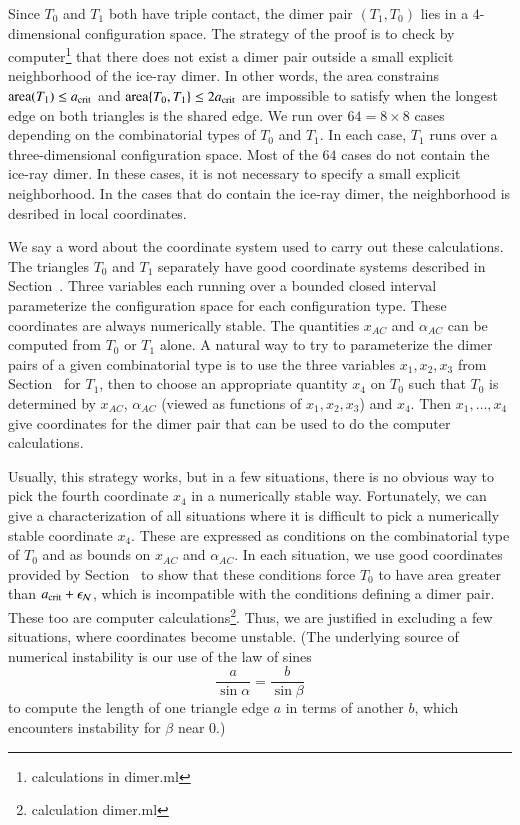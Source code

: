 Since $T_0$ and $T_1$ both have triple contact, the dimer pair
$(T_1,T_0)$ lies in a $4$-dimensional configuration space.  The
strategy of the proof is to check by computer\footnote{calculations in
  dimer.ml} that there does not exist a dimer pair outside a small
explicit neighborhood of the ice-ray dimer.  In other words, the area
constrains ${\operatorname{area}}(T_1)\le a_\text{crit}$ and ${\operatorname{area}}\{T_0,T_1\}\le2a_\text{crit}$ are
impossible to satisfy when the longest edge on both triangles is the
shared edge.  We run over $64 = 8\times 8$ cases depending on the
combinatorial types of $T_0$ and $T_1$.  In each case, $T_1$ runs over
a three-dimensional configuration space.  Most of the $64$ cases do
not contain the ice-ray dimer.  In these cases, it is not necessary to
specify a small explicit neighborhood.  In the cases that do contain
the ice-ray dimer, the neighborhood is desribed in local coordinates.

We say a word about the coordinate system used to carry out these
calculations.  The triangles $T_0$ and $T_1$ separately have good
coordinate systems described in Section~.  Three
variables each running over a bounded closed interval parameterize the
configuration space for each configuration type.  These coordinates
are always numerically stable.  The quantities $x_{AC}$ and
$\alpha_{AC}$ can be computed from $T_0$ or $T_1$ alone.  A natural
way to try to parameterize the dimer pairs of a given combinatorial
type is to use the three variables $x_1,x_2,x_3$ from
Section~ for $T_1$, then to choose an appropriate
quantity $x_4$ on $T_0$ such that $T_0$ is determined by $x_{AC}$,
$\alpha_{AC}$ (viewed as functions of $x_1,x_2,x_3$) and $x_4$.  Then
$x_1,\ldots,x_4$ give coordinates for the dimer pair that can be used
to do the computer calculations.

Usually, this strategy works, but in a few situations, there is no
obvious way to pick the fourth coordinate $x_4$ in a numerically
stable way.  Fortunately, we can give a characterization of all
situations where it is difficult to pick a numerically stable
coordinate $x_4$.  These are expressed as conditions on the
combinatorial type of $T_0$ and as bounds on $x_{AC}$ and
$\alpha_{AC}$.  In each situation, we use good coordinates provided by
Section~ to show that these conditions force $T_0$ to
have area greater than $a_\text{crit}+\epsilon_{\mathcal N}$, which is incompatible with the
conditions defining a dimer pair.  These too are computer
calculations\footnote{calculation dimer.ml}.  Thus, we are justified
in excluding a few situations, where coordinates become unstable.
(The underlying source of numerical instability is our use of the law
of sines
\[
\frac{a}{\sin\alpha} = \frac{b}{\sin\beta}
\]
to compute the length of one triangle edge $a$ in terms of another
$b$, which encounters instability for $\beta$ near $0$.)

